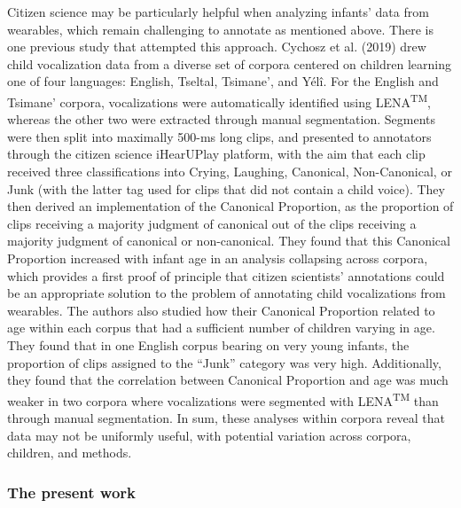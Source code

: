 \documentclass[english,,man]{apa6}
\begin{document}
Citizen science may be particularly helpful when analyzing infants' data from wearables, which remain challenging to annotate as mentioned above. There is one previous study that attempted this approach. Cychosz et al. (2019) drew child vocalization data from a diverse set of corpora centered on children learning one of four languages: English, Tseltal, Tsimane', and Yélî. For the English and Tsimane' corpora, vocalizations were automatically identified using LENA\textsuperscript{TM}, whereas the other two were extracted through manual segmentation. Segments were then split into maximally 500-ms long clips, and presented to annotators through the citizen science iHearUPlay platform, with the aim that each clip received three classifications into Crying, Laughing, Canonical, Non-Canonical, or Junk (with the latter tag used for clips that did not contain a child voice). They then derived an implementation of the Canonical Proportion, as the proportion of clips receiving a majority judgment of canonical out of the clips receiving a majority judgment of canonical or non-canonical. They found that this Canonical Proportion increased with infant age in an analysis collapsing across corpora, which provides a first proof of principle that citizen scientists' annotations could be an appropriate solution to the problem of annotating child vocalizations from wearables. The authors also studied how their Canonical Proportion related to age within each corpus that had a sufficient number of children varying in age. They found that in one English corpus bearing on very young infants, the proportion of clips assigned to the \enquote{Junk} category was very high. Additionally, they found that the correlation between Canonical Proportion and age was much weaker in two corpora where vocalizations were segmented with LENA\textsuperscript{TM} than through manual segmentation. In sum, these analyses within corpora reveal that data may not be uniformly useful, with potential variation across corpora, children, and methods.

\hypertarget{the-present-work}{%
\subsubsection{The present work}\label{the-present-work}}
\end{document}
